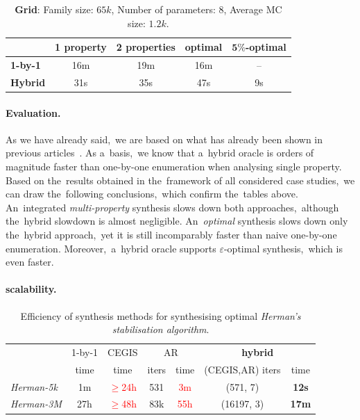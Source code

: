 \begin{table}[h!]
\centering
\begin{tabular}{l|cccc}
    \hline \hline 
    & \multicolumn{1}{l}{\textbf{1 property}} & \multicolumn{1}{l}{\textbf{2 properties}} & \multicolumn{1}{l}{\textbf{optimal}} & \multicolumn{1}{l}{\textbf{$\mathbf{5\%}$-optimal}} \\ \hline
    \textbf{1-by-1} & 16m & 19m & 16m & \,--\, \\
    \textbf{Hybrid} & 31s & 35s & 47s & 9s \\ \hline \hline
\end{tabular}
\caption{\textbf{Grid}: Family size: $65k$, Number of parameters: $8$, Average MC size: $1.2k$.}
\end{table}
    

\paragraph{Evaluation.}
As we have already said,~we are based on what has already been shown in previous articles~\cite{roman-DP,cegar,cegis}.
As a~basis,~we know that a~hybrid oracle is orders of magnitude faster than one-by-one enumeration when analysing single property.
Based on the~results obtained in the~framework of all considered case studies,~we can draw the~following conclusions,~which confirm the~tables above.
An~integrated \emph{multi-property} synthesis slows down both approaches,~although the~hybrid slowdown is almost negligible.
An~\emph{optimal} synthesis slows down only the~hybrid approach,~yet it is still incomparably faster than naive one-by-one enumeration.
Moreover,~a~hybrid oracle supports $\varepsilon$-optimal synthesis,~which is even faster.

\paragraph{\toolname{} scalability.}

\begin{table}[h!]
\centering
\begin{tabular} {l|c|c|c|c|c|c}
{\multirow{2}{*}{model}} & 1-by-1 & CEGIS & \multicolumn{2}{c|}{AR} & \multicolumn{2}{c}{\textbf{hybrid}} \\
& time & time & iters & time & (CEGIS,AR) iters & time \\
\hline
{\emph{Herman-5k}} & 1m & \textcolor{red}{$\geq$24h} & 531 & \textcolor{red}{3m} & (571, 7) & \textbf{12s} \\ \hline
{\emph{Herman-3M}} & 27h & \textcolor{red}{$\geq$48h} & 83k & \textcolor{red}{55h} & (16197, 3) & \textbf{17m} \\ \hline
\end{tabular}
\caption{Efficiency of synthesis methods for synthesising optimal \emph{Herman's stabilisation algorithm}.} 
\end{table}


